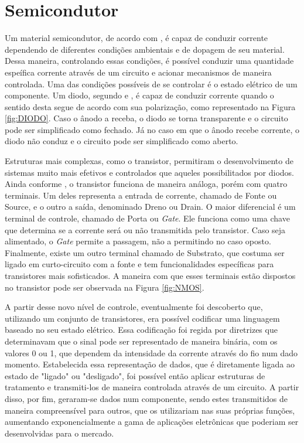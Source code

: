 \documentclass[
	12pt,				%
    oneside,			%
	a4paper,			%
	english,			%
	french,				%
	spanish,			%
	brazil				%
	]{abntex2}
\begin{document}
\section{Semicondutor}

Um material semicondutor, de acordo com \citeauthor{Holger}, é capaz de conduzir corrente dependendo de diferentes condições ambientais e de dopagem de seu material. Dessa maneira, controlando essas condições, é possível conduzir uma quantidade espeífica corrente através de um circuito e acionar mecanismos de maneira controlada. Uma das condições possíveis de se controlar é o estado elétrico de um componente. Um diodo, segundo \citeauthor{Umesh} e \citeauthor{Amos}, é capaz de conduzir corrente quando o sentido desta segue de acordo com sua polarização, como representado na Figura \ref{fig:DIODO}. Caso o ânodo a receba, o diodo se torna transparente e o circuito pode ser simplificado como fechado. Já no caso em que o ânodo recebe corrente, o diodo não conduz e o circuito pode ser simplificado como aberto.



Estruturas mais complexas, como o transistor, permitiram o desenvolvimento de sistemas muito mais efetivos e controlados que aqueles possibilitados por diodos. Ainda conforme \citeauthor{Amos}, o transistor funciona de maneira análoga, porém com quatro terminais. Um deles representa a entrada de corrente, chamado de Fonte ou Source, e o outro a saída, denominado Dreno ou Drain. O maior diferencial é um terminal de controle, chamado de Porta ou \textit{Gate}. Ele funciona como uma chave que determina se a corrente será ou não transmitida pelo transistor. Caso seja alimentado, o \textit{Gate} permite a passagem, não a permitindo no caso oposto. Finalmente, existe um outro terminal chamado de Substrato, que costuma ser ligado em curto-circuito com a fonte e tem funcionalidades específicas para transistores mais sofisticados. A maneira com que esses terminais estão dispostos no transistor pode ser observada na Figura \ref{fig:NMOS}.



A partir desse novo nível de controle, eventualmente foi descoberto que, utilizando um conjunto de transistores, era possível codificar uma linguagem baseado no seu estado elétrico. Essa codificação foi regida por diretrizes que determinavam que o sinal pode ser representado de maneira binária, com os valores 0 ou 1, que dependem da intensidade da corrente através do fio num dado momento. Estabelecida essa representação de dados, que é diretamente ligada ao estado de "ligado" ou "desligado", foi possível então aplicar estruturas de tratamento e transmiti-los de maneira controlada através de um circuito. A partir disso, por fim, geraram-se dados num componente, sendo estes transmitidos de maneira compreensível para outros, que os utilizariam nas suas próprias funções, aumentando exponencialmente a gama de aplicações eletrônicas que poderiam ser desenvolvidas para o mercado.
\end{document}
